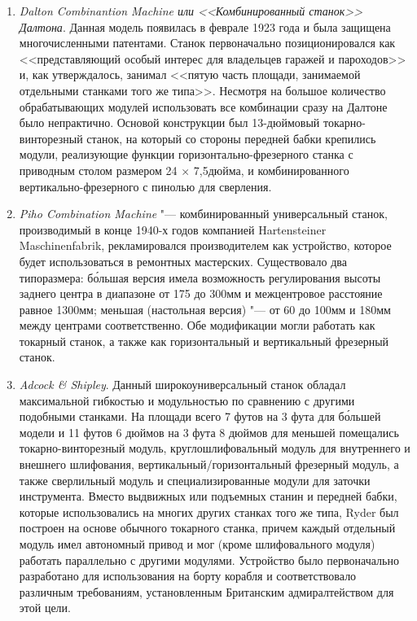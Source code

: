 \begin{enumerate}
	\item\textit{Dalton Combinantion Machine или <<Комбинированный станок>> Далтона}. Данная модель появилась в феврале 1923 года и была защищена многочисленными патентами. Станок первоначально позиционировался как <<представляющий особый интерес для владельцев гаражей и пароходов>> и, как утверждалось, занимал <<пятую часть площади, занимаемой отдельными станками того же типа>>. Несмотря на большое количество обрабатывающих модулей использовать все комбинации сразу на Далтоне было непрактично. Основой конструкции был 13-дюймовый токарно-винторезный станок, на который со стороны передней бабки крепились модули, реализующие функции горизонтально-фрезерного станка с приводным столом размером 24 $\times$ 7,5\:дюйма, и комбинированного вертикально-фрезерного с пинолью для сверления.
	\item\textit{Piho Combination Machine} "--- комбинированный универсальный станок, производимый в конце 1940-х годов компанией Hartensteiner Maschinenfabrik, рекламировался производителем как устройство, которое будет использоваться в ремонтных мастерских. Существовало два типоразмера: б\'ольшая версия имела возможность регулирования высоты заднего центра в диапазоне от 175 до 300\:мм и межцентровое расстояние равное 1300\:мм; меньшая (настольная версия) "--- от 60 до 100\:мм и 180\:мм между центрами соответственно. Обе модификации могли работать как токарный станок, а также как горизонтальный и вертикальный фрезерный станок.
	\item\textit{Adcock \& Shipley}. Данный широкоуниверсальный станок обладал максимальной гибкостью и модульностью по сравнению с другими подобными станками. На площади всего 7 футов на 3 фута для б\'ольшей модели и 11 футов 6 дюймов на 3 фута 8 дюймов для меньшей помещались токарно-винторезный модуль, круглошлифовальный модуль для внутреннего и внешнего шлифования, вертикальный/горизонтальный фрезерный модуль, а также сверлильный модуль и специализированные модули для заточки инструмента. Вместо выдвижных или подъемных станин и передней бабки, которые использовались на многих других станках того же типа, Ryder был построен на основе обычного токарного станка, причем каждый отдельный модуль имел автономный привод и мог (кроме шлифовального модуля) работать параллельно с другими модулями. Устройство было первоначально разработано для использования на борту корабля и соответствовало различным требованиям, установленным Британским адмиралтейством для этой цели.
\end{enumerate}

